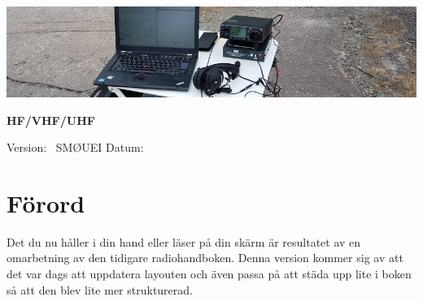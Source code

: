 
	
\pagestyle{empty}
\vfill
\vspace*{4cm}
\centerline{\includegraphics[width=\paperwidth]{logo/rubrikbild}}
\begin{flushright}
\Huge{\bfseries{\TitleText} HF/VHF/UHF} \\[3mm]
\Large{\bfseries{\SubtitleText}}
\end{flushright}

\vfill

Version: \DokVersion\ \hfill SMØUEI \hfill Datum: \DokumentDatum

\newpage


\pagestyle{fancy}
\lhead{\leftmark}

\chead{}


\cfoot{\scriptsize \thepage\ / \pageref{LastPage}}


\renewcommand{\footrulewidth}{0.2pt}



\cleardoublepage

\tableofcontents

\newpage

\setlength{\parskip}{0.5em}
\setlength{\parindent}{0pt}

\section*{Förord}

Det du nu håller i din hand eller läser på din skärm är resultatet av
en omarbetning av den tidigare radiohandboken. Denna version kommer
sig av att det var dags att uppdatera layouten och även passa på att
städa upp lite i boken så att den blev lite mer strukturerad.

